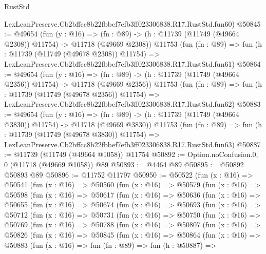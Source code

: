 \begin{lexlean}{RustStd}
\begin{coremodule}
    LexLeanPreserve.Cb2bffcc8b22fbbef7efb3ff023306838.R17.RustStd.fun60)
@50845 := @49654
    (fun (y : @16) =>
    (fn : @89) -> (h : @11739 (@11749 (@49664 @2308)) @11754) -> @11718 (@49669 @2308))
    @11753
    (fun (fn : @89) =>
    fun (h : @11739 (@11749 (@49678 @2308)) @11754) =>
    LexLeanPreserve.Cb2bffcc8b22fbbef7efb3ff023306838.R17.RustStd.fun61)
@50864 := @49654
    (fun (y : @16) =>
    (fn : @89) -> (h : @11739 (@11749 (@49664 @2356)) @11754) -> @11718 (@49669 @2356))
    @11753
    (fun (fn : @89) =>
    fun (h : @11739 (@11749 (@49678 @2356)) @11754) =>
    LexLeanPreserve.Cb2bffcc8b22fbbef7efb3ff023306838.R17.RustStd.fun62)
@50883 := @49654
    (fun (y : @16) =>
    (fn : @89) -> (h : @11739 (@11749 (@49664 @3830)) @11754) -> @11718 (@49669 @3830))
    @11753
    (fun (fn : @89) =>
    fun (h : @11739 (@11749 (@49678 @3830)) @11754) =>
    LexLeanPreserve.Cb2bffcc8b22fbbef7efb3ff023306838.R17.RustStd.fun63)
@50887 := @11739 (@11749 (@49664 @1058)) @11754
@50892 := Option.noConfusion.{0, 0} (@11718 (@49669 @1058)) @89
@50893 := @4464 @89
@50895 := @50892 @50893 @89
@50896 := @11752 @11797
@50950 := @50522
    (fun (x : @16) =>
    @50541
      (fun (x : @16) =>
      @50560
        (fun (x : @16) =>
        @50579
          (fun (x : @16) =>
          @50598
            (fun (x : @16) =>
            @50617
              (fun (x : @16) =>
              @50636
                (fun (x : @16) =>
                @50655
                  (fun (x : @16) =>
                  @50674
                    (fun (x : @16) =>
                    @50693
                      (fun (x : @16) =>
                      @50712
                        (fun (x : @16) =>
                        @50731
                          (fun (x : @16) =>
                          @50750
                            (fun (x : @16) =>
                            @50769
                              (fun (x : @16) =>
                              @50788
                                (fun (x : @16) =>
                                @50807
                                  (fun (x : @16) =>
                                  @50826
                                    (fun (x : @16) =>
                                    @50845
                                      (fun (x : @16) =>
                                      @50864
                                        (fun (x : @16) =>
                                        @50883
                                          (fun (x : @16) =>
                                          fun (fn : @89) =>
                                          fun (h : @50887) =>

\end{coremodule}
\end{lexlean}
